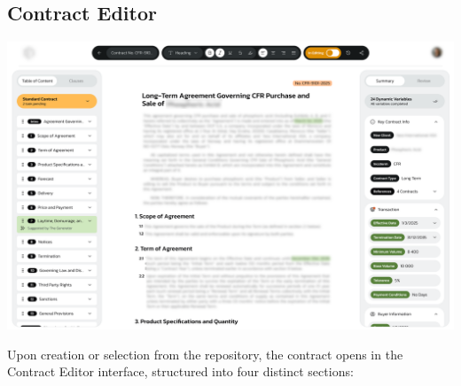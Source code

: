 \subsection{Contract Editor}
\begin{center}
    \centering
    \includegraphics[width=1\textwidth]{Images/Contract Editor Page.png}
    \label{fig:contract_editor_page}
\end{center}

Upon creation or selection from the repository, the contract opens in the Contract Editor interface, structured into four distinct sections:

